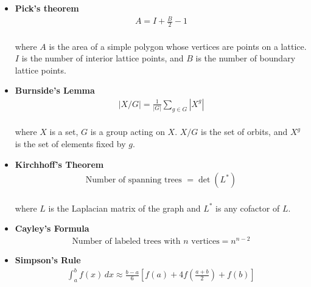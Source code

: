 \begin{itemize}
    \item \textbf{Pick's theorem} \\
    \begin{equation*}
    \begin{aligned}
    A = I + \frac{B}{2} - 1
    \end{aligned}
    \end{equation*} \\ 
    where $A$ is the area of a simple polygon whose vertices are points on a lattice. $I$ is the number of interior lattice points, and $B$ is the number of boundary lattice points. 

    \item \textbf{Burnside's Lemma} \\
    \begin{equation*}
    \begin{aligned}
    |X/G| = \frac{1}{|G|} \sum_{g \in G} |X^g|
    \end{aligned}
    \end{equation*} \\ 
    where $X$ is a set, $G$ is a group acting on $X$. $X/G$ is the set of orbits, and $X^g$ is the set of elements fixed by $g$.

    \item \textbf{Kirchhoff's Theorem} \\
    \begin{equation*}
    \begin{aligned}
    \text{Number of spanning trees } = \det(L^*)
    \end{aligned}
    \end{equation*} \\ 
    where $L$ is the Laplacian matrix of the graph and $L^*$ is any cofactor of $L$.

    \item \textbf{Cayley's Formula} \\
    \begin{equation*}
    \begin{aligned}
    \text{Number of labeled trees with $n$ vertices} = n^{n-2}
    \end{aligned}
    \end{equation*}

    \item \textbf{Simpson's Rule} \\
    \begin{equation*}
    \begin{aligned}
    \int_{a}^{b} f(x)\,dx \approx \frac{b-a}{6}
\left[ f(a) + 4f\!\left(\frac{a+b}{2}\right) + f(b) \right]
    \end{aligned}
    \end{equation*} 


\end{itemize}
